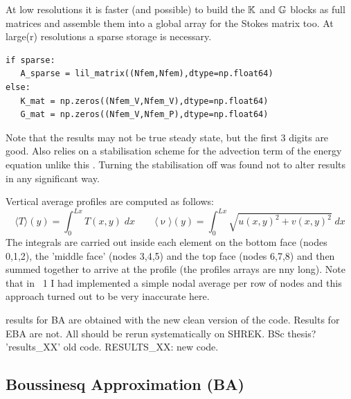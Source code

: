 At low resolutions it is faster (and possible) to build the ${\mathbb{K}}$ and ${\mathbb{G}}$
blocks as full matrices and assemble them into a global array for the Stokes 
matrix too. At large(r) resolutions a sparse storage is necessary. 

\begin{lstlisting}
if sparse:
   A_sparse = lil_matrix((Nfem,Nfem),dtype=np.float64)
else:   
   K_mat = np.zeros((Nfem_V,Nfem_V),dtype=np.float64) 
   G_mat = np.zeros((Nfem_V,Nfem_P),dtype=np.float64) 
\end{lstlisting}

Note that the \aspect results may not be true steady state, but the first 3 digits are good.
Also \aspect relies on a stabilisation scheme for the advection term of the energy equation
unlike this \stone. Turning the stabilisation off was found not to alter results in any 
significant way.

Vertical average profiles are computed as follows:
\[
\langle T \rangle (y) = \int_0^{Lx} T(x,y) \; dx 
\qquad
\langle \upnu \rangle (y) = \int_0^{Lx} \sqrt{u(x,y)^2+v(x,y)^2} \; dx 
\]
The integrals are carried out inside each element on the bottom face (nodes 0,1,2),
the 'middle face' (nodes 3,4,5) and the top face (nodes 6,7,8) and then summed together
to arrive at the profile (the profiles arrays are nny long). 
Note that in \stone~1 I had implemented a simple nodal average
per row of nodes and this approach turned out to be very inaccurate here.   

{\color{red} results for BA are obtained with the new clean version of 
the code. Results for EBA are not. All should be rerun systematically 
on SHREK. BSc thesis? 'results\_XX' old code. RESULTS\_XX: new code.}

\newpage
\subsection*{Boussinesq Approximation (BA)}

